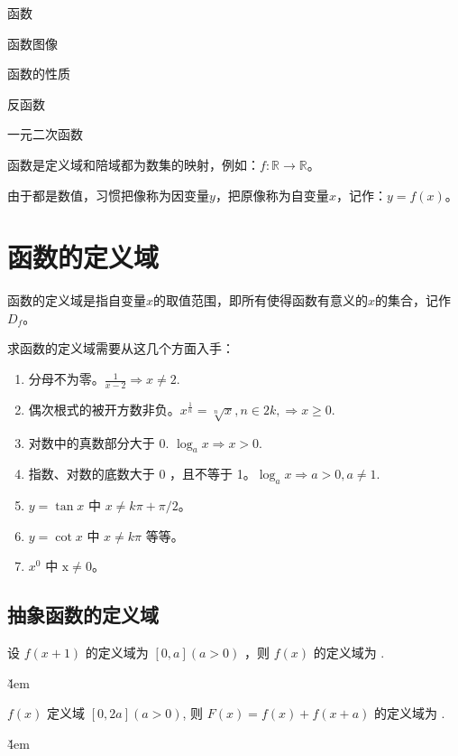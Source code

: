 \begin{introduction}
    \item 函数
    \item 函数图像
    \item 函数的性质
    \item 反函数
    \item 一元二次函数
\end{introduction}

\begin{definition}[函数]
    函数是定义域和陪域都为数集的映射，例如：$f:\mathbb{R}\to \mathbb{R}$。

    由于都是数值，习惯把像称为因变量$y$，把原像称为自变量$x$，记作：$y=f(x)$。
\end{definition}

\section{函数的定义域}

\begin{definition}[定义域]
    函数的定义域是指自变量$x$的取值范围，即所有使得函数有意义的$x$的集合，记作$D_f$。
\end{definition}

\begin{theorem}[常用的定义域]
    求函数的定义域需要从这几个方面入手：

    \begin{minipage}[t]{0.65\linewidth}
        \begin{enumerate}
            \item 分母不为零。$\frac{1}{x-2} \Rightarrow x \neq 2$.
            \item 偶次根式的被开方数非负。$x^{\frac{1}{n}}=\sqrt[n]{x}, n \in 2k, \Rightarrow x \geqslant 0$.
            \item 对数中的真数部分大于 0. $\log_a x \Rightarrow x > 0$.
            \item 指数、对数的底数大于 0 ，且不等于 1。$\log_a x \Rightarrow a>0, a \neq 1$.
        \end{enumerate}
    \end{minipage}
    \hfill
    \begin{minipage}[t]{0.33\linewidth}
        \begin{enumerate}\setcounter{enumi}{4}
            \item $y=\tan x$ 中 $x \neq k \pi+\pi / 2$。
            \item $y=\cot x$ 中 $x \neq k \pi$ 等等。
            \item $x^0$ 中 $\mathrm{x} \neq 0$。
        \end{enumerate}
    \end{minipage}
\end{theorem}

\subsection{抽象函数的定义域}

\begin{example}
    设 $f(x+1)$ 的定义域为 $[0, a](a>0)$ ，则 $f(x)$ 的定义域为 \underline{\qquad}.
\end{example}

\v{4em}

\begin{example}
    $f(x)$ 定义域 $[0,2 a](a>0)$, 则 $F(x)=f(x)+f(x+a)$ 的定义域为 \underline{\qquad}.
\end{example}

\v{4em}

